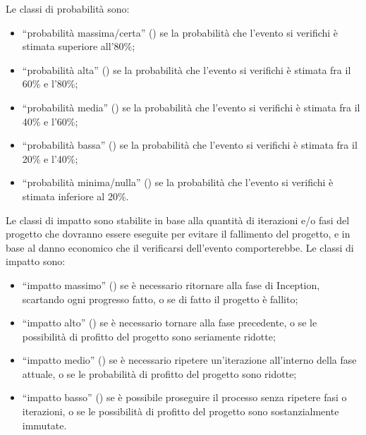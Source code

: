 \documentclass[10pt]{softeng} %
\begin{document}
Le classi di probabilit\`a sono:
\begin{itemize}
	\item ``probabilit\`a massima/certa'' () se la probabilit\`a che l'evento si verifichi \`e stimata superiore all'80\%;
	\item ``probabilit\`a alta'' () se la probabilit\`a che l'evento si verifichi \`e stimata fra il 60\% e l'80\%;
	\item ``probabilit\`a media'' () se la probabilit\`a che l'evento si verifichi \`e stimata fra il 40\% e l'60\%;
	\item ``probabilit\`a bassa'' () se la probabilit\`a che l'evento si verifichi \`e stimata fra il 20\% e l'40\%;
	\item ``probabilit\`a minima/nulla'' () se la probabilit\`a che l'evento si verifichi \`e stimata inferiore al 20\%.
\end{itemize}

Le classi di impatto sono stabilite in base alla quantit\`a di iterazioni e/o fasi del progetto che dovranno essere eseguite per evitare il fallimento del progetto, e in base al danno economico che il verificarsi dell'evento comporterebbe.
Le classi di impatto sono:
\begin{itemize}
	\item ``impatto massimo'' () se \`e necessario ritornare alla fase di Inception, scartando ogni progresso fatto, o se di fatto il progetto \`e fallito;
	\item ``impatto alto'' () se \`e necessario tornare alla fase precedente, o se le possibilit\`a di profitto del progetto sono seriamente ridotte;
	\item ``impatto medio'' () se \`e necessario ripetere un'iterazione all'interno della fase attuale, o se le probabilit\`a di profitto del progetto sono ridotte;
	\item ``impatto basso'' () se \`e possibile proseguire il processo senza ripetere fasi o iterazioni, o se le possibilit\`a di profitto del progetto sono sostanzialmente immutate.
\end{itemize}
\end{document}
